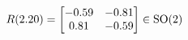 \documentclass[preview]{standalone}
\begin{document}
\begin{align*}
\special{dvisvgm:raw <g id='unique000'>}R(2.20) = \begin{bmatrix} -0.59 & -0.81 \\ 0.81 & -0.59 \end{bmatrix} \in \text{SO}(2)\special{dvisvgm:raw </g>}
\end{align*}
\end{document}
